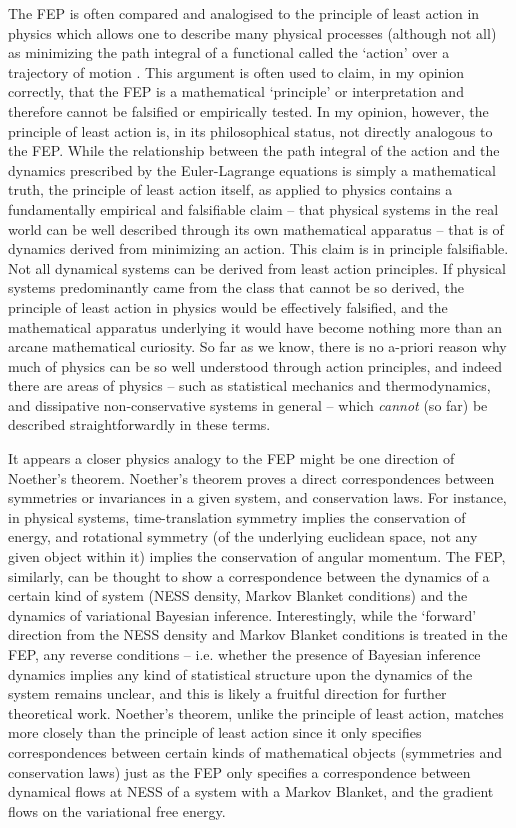 The FEP is often compared and analogised to the principle of least action in physics \citep{lanczos2012variational} which allows one to describe many physical processes (although not all) as minimizing the path integral of a functional called the `action' over a trajectory of motion \citep{sussman2015structure}. This argument is often used to claim, in my opinion correctly, that the FEP is a mathematical `principle' or interpretation and therefore cannot be falsified or empirically tested. In my opinion, however, the principle of least action is, in its philosophical status, not directly analogous to the FEP. While the relationship between the path integral of the action and the dynamics prescribed by the Euler-Lagrange equations is simply a mathematical truth, the principle of least action itself, as applied to physics contains a fundamentally empirical and falsifiable claim -- that physical systems in the real world can be well described through its own mathematical apparatus -- that is of dynamics derived from minimizing an action. This claim is in principle falsifiable. Not all dynamical systems can be derived from least action principles. If physical systems predominantly came from the class that cannot be so derived, the principle of least action in physics would be effectively falsified, and the mathematical apparatus underlying it would have become nothing more than an arcane mathematical curiosity. So far as we know, there is no a-priori reason why much of physics can be so well understood through action principles, and indeed there are areas of physics -- such as statistical mechanics and thermodynamics, and dissipative non-conservative systems in general -- which \emph{cannot} (so far) be described straightforwardly in these terms.

It appears a closer physics analogy to the FEP might be one direction of Noether's theorem. Noether's theorem proves a direct correspondences between symmetries or invariances in a given system, and conservation laws. For instance, in physical systems, time-translation symmetry implies the conservation of energy, and rotational symmetry (of the underlying euclidean space, not any given object within it) implies the conservation of angular momentum. The FEP, similarly, can be thought to show a correspondence between the dynamics of a certain kind of system (NESS density, Markov Blanket conditions) and the dynamics of variational Bayesian inference. Interestingly, while the `forward' direction from the NESS density and Markov Blanket conditions is treated in the FEP, any reverse conditions -- i.e. whether the presence of Bayesian inference dynamics implies any kind of statistical structure upon the dynamics of the system remains unclear, and this is likely a fruitful direction for further theoretical work. Noether's theorem, unlike the principle of least action, matches more closely than the principle of least action since it only specifies correspondences between certain kinds of mathematical objects (symmetries and conservation laws) just as the FEP only specifies a correspondence between dynamical flows at NESS of a system with a Markov Blanket, and the gradient flows on the variational free energy.

